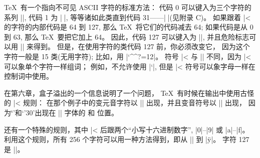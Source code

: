 {%
\danger \TeX\ 有一个指向不可见 ASCII 字符的标准方法：
代码 0 可以键入为三个字符的系列 |^^@|,
代码 1 为 |^^A|, 等等诸如此类直到代码 31——|^^_|(见附录 C)。
如果跟着 |^^| 的字符的内部代码是 64 到 127, 那么 \TeX\ 将它们的代码减去 64;
如果代码是从 0 到 63, 那么 \TeX\ 要把它加上 64。%
因此，代码 127 可以键入为 |^^?|, 并且危险标志可以用 |{\manual^^?}| 来得到。%
但是，在使用字符的类代码 127 前，你必须改变它，
因为这个字符一般是 15 类(无用字符); 比如，用 |\catcode`\^^?=12|。%
符号 |^^| 与 |\char| 不同，因为 |^^| 可以象单个字符一样组词；
例如，不允许使用 |\catcode`|, 但是 |^^| 符号可以象字母一样在控制词中使用。

\danger 在第六章，盒子溢出的一个信息说明了一个问题，
\TeX\ 有时候在输出中使用古怪的 |^^| 规则：
在那个例子中的变元音字符以 |^^?| 出现，并且变音符号以 |^^X| 出现，
因为`\thinspace\"{}\thinspace'和`\char'30'出现在 |\tenrm| 字体的%
 和 位置。%

\danger 还有一个特殊的规则，其中 |^^| 后跟{两个}``小写十六进制数字'',
|0|--|9| 或 |a|--|f|。%
利用这个规则，所有 256 个字符可以用一种方法得到，即从 |^^00| 到 |^^ff|。%
字符 127 是 |^^7f|。

}
